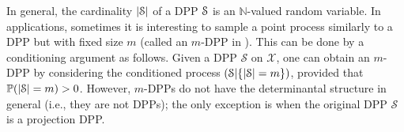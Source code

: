 \begin{comment}
    Looking at the atomic distribution, one can also define L-ensembles.

\begin{definition}
    Let $L$ be a semi-definite matrix (the likelihood kernel). An L-ensemble over $[N]$ is a probability distribution over $2^{[N]}$ such that, if $\mathcal{S}$ is sampled according to this distribution:

    \[ \forall S \subset [N] \text{ , } \mathbb{P}(\mathcal{S} = S) = \det(L+I)^{-1}\operatorname{Det}(L_{Y}) \]

    where $\operatorname{Det}(L+I)^{-1}$ acts as the normalization constant.
\end{definition}

It can be shown that each L-ensemble is a DPP with marginal kernel $K = L(I+L)^{-1}$. A DPP with kernel $K$ is also an $L$-ensemble, provided that the spectrum of the marginal kernel $K$  is in $[0,1)$.

This definition gives also a second insight on the repulsiveness. Indeed, on a geometric point of view, if to each element $i$, one associates a feature $q_i$ in some abstract Hilbert space, then $L_{ij}$ can be interpreted as $q_i^T q_j $. Then $\mathbb{P}(S = \mathcal{S}) \propto \operatorname{Vol}(q_i)_{i \in S}^2$, which show, using the "base times height" formula, that sampling from a DPP leads to favour elements which have diverse features.
\end{comment}


In general, the cardinality $|\mathcal{S}|$ of a DPP $\mathcal{S}$ is an $\mathbb N$-valued random variable. In applications, sometimes it is interesting to sample a point process similarly to a DPP but with fixed size $m$ (called an $m$-DPP in  \cite{kulesza_determinantal_2012}). This can be done by a conditioning argument as follows. Given a DPP $\mathcal S$ on $\mathcal X$, one can obtain an $m$-DPP by considering the conditioned process $(\mathcal{S}| \{|\mathcal{S}| = m\} )$, provided that $\mathbb P (|\mathcal{S}|= m ) >0$. However, $m$-DPPs do not have the determinantal structure in general (i.e., they are not DPPs); the only exception is when the original DPP $\mathcal S$ is a projection DPP.

